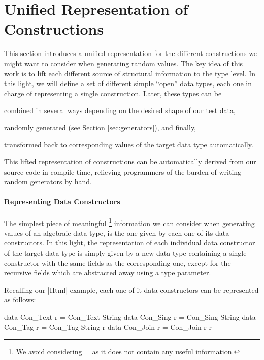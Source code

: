 \section{Unified Representation of Constructions}
\label{sec:representation}

%
This section introduces a unified representation for the different constructions
we might want to consider when generating random values.
%
The key idea of this work is to lift each different source of structural
information to the type level.
%
In this light, we will define a set of different simple ``open'' data types,
each one in charge of representing a single construction.
%
Later, these types can be
\begin{inparaenum}[(i)]
  \item combined in several ways depending on the desired shape of our test data,
\item randomly generated (see Section \ref{sec:generators}), and finally,
\item transformed back to corresponding values of the target data type automatically.
\end{inparaenum}
%
This lifted representation of constructions can be automatically derived from
our source code in compile-time, relieving programmers of the burden of writing
random generators by hand.


%
\paragraph{Representing Data Constructors}
%
The simplest piece of meaningful%
\footnote{We avoid considering $\bot$ as it does not contain any useful
  information.}
%
information we can consider when generating values of an algebraic data type, is
the one given by each one of its data constructors.
%
In this light, the representation of each individual data constructor of the
target data type is simply given by a new data type containing a single
constructor with the same fields as the corresponding one, except for the
recursive fields which are abstracted away using a type parameter.


Recalling our |Html| example, each one of it data constructors can be
represented as follows:

\begin{code}
data Con_Text   r = Con_Text String
data Con_Sing   r = Con_Sing String
data Con_Tag    r = Con_Tag  String r
data Con_Join   r = Con_Join r r
\end{code}



